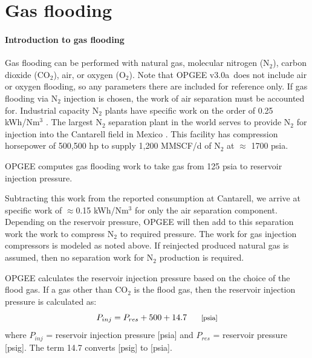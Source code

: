 \documentclass[11pt]{report}
\newcommand{\marg}[1]{{\footnotesize\textit{\textcolor{stanford}{'#1'}}}}
\newcommand{\marginnote}[1]{\marginpar{\marg{#1}}}
\newcommand{\version}{v3.0a}
\begin{document}
{\clearpage

\section{Gas flooding}
\label{GasFlooding}


\paragraph{Introduction to gas flooding}\label{par:IntroGasFlooding}

Gas flooding can be performed with natural gas, molecular nitrogen (N$_2$), carbon dioxide (CO$_2$), air, or oxygen (O$_2$). Note that OPGEE \version \, does not include air or oxygen flooding, so any parameters there are included for reference only.\marginnote{Production \& Extraction 2.8} If gas flooding via N$_2$ injection is chosen, the work of air separation must be accounted for. Industrial capacity N$_2$ plants have specific work on the order of 0.25 kWh/Nm$^3$ \cite{Bocker2013}. The largest N$_2$ separation plant in the world serves to provide N$_2$ for injection into the Cantarell field in Mexico \cite{Kuo2001}. This facility has compression horsepower of 500,500 hp to supply 1,200 MMSCF/d of N$_2$ at $\approx$ 1700 psia.

OPGEE computes gas flooding work to take gas from 125 psia to reservoir injection pressure. \marginnote{Production \& Extraction 2.7.4} 

 Subtracting this work from the reported consumption at Cantarell, we arrive at specific work of $\approx$0.15 kWh/Nm$^3$ for only the air separation component. Depending on the reservoir pressure, OPGEE will then add to this separation work the work to compress N$_2$ to required pressure. The work for gas injection compressors is modeled as noted above. If reinjected produced natural gas is assumed, then no separation work for N$_2$ production is required.

OPGEE calculates the reservoir injection pressure based on the choice of the flood gas. If a gas other than CO$_2$ is the flood gas, then the reservoir injection pressure is calculated as:
\begin{equation} \label{eq:NONCO2ReservoirInjectionPressure}
P_{inj} = P_{res} + 500 + 14.7 \begin{footnotesize} \quad\quad\text{[psia]} \end{footnotesize}
\end{equation}
where $P_{inj}$ = reservoir injection pressure [psia] and $P_{res}$ = reservoir pressure [psig]. The term 14.7 converts [psig] to [psia].



}
\end{document}
